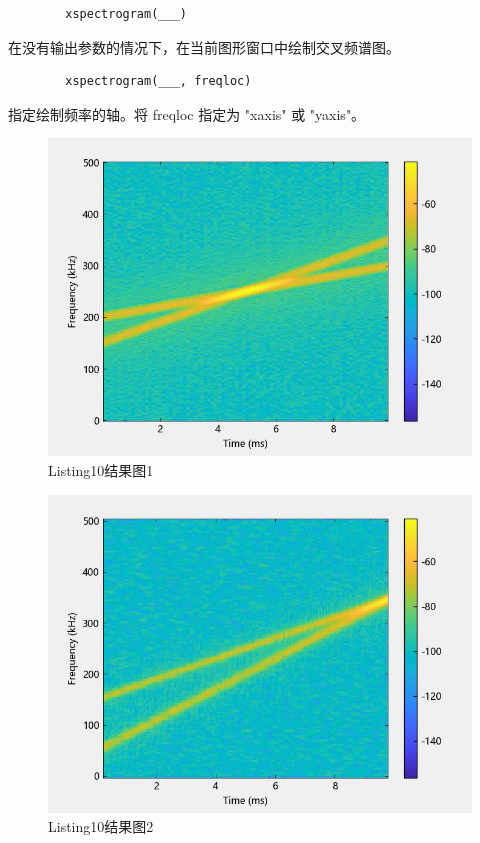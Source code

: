 \documentclass{article}
\begin{document}
	\begin{verbatim}
		xspectrogram(___)
	\end{verbatim}
	
	在没有输出参数的情况下，在当前图形窗口中绘制交叉频谱图。
	
	\begin{verbatim}
		xspectrogram(___, freqloc)
	\end{verbatim}
	
	指定绘制频率的轴。将 freqloc 指定为 "xaxis" 或 "yaxis"。
	
	
	\begin{figure}[htbp]
		\centering
		\includegraphics{hw5(10)-1.jpeg}
		\caption{Listing10结果图1}
		\label{fig10-1}
	\end{figure}
	\begin{figure}[htbp]
		\centering
		\includegraphics{hw5(10)-2.jpeg}
		\caption{Listing10结果图2}
		\label{fig10-2}
	\end{figure}
\end{document}

